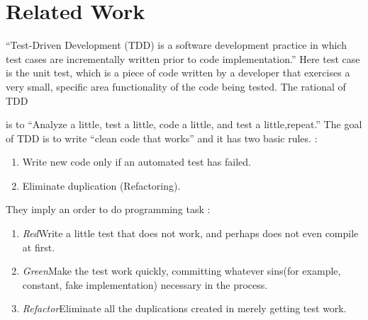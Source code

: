 
\chapter{Related Work}
``Test-Driven Development (TDD) is a software development practice in which
test cases are incrementally written prior to code
implementation.''\cite{George_2003} Here test case is the unit test, which
is a piece of code written by a developer that exercises a very small,
specific area functionality of the code being tested. The rational of TDD


is to ``Analyze a little, test a little, code a little, and test a
little,repeat.'' The goal of TDD is to write ``clean code that
works''\cite{Beck_TDD_2003} and it has two basic rules.
\cite{Beck_TDD_2003}:

\begin{enumerate}
\item Write new code only if an automated test has failed.
\item Eliminate duplication (Refactoring).
\end{enumerate}

\begin{description}
\item They imply an order to do programming task \cite{Beck_TDD_2003}:
\begin{enumerate}
\item \emph{Red}\newline Write a little test that does not work, and perhaps
does not even compile at first.
\item \emph{Green}\newline Make the test work quickly, committing whatever
sins(for example, constant, fake implementation) necessary in the process.
\item \emph{Refactor}\newline Eliminate all the duplications created in
merely getting test work.
\end{enumerate}
\end{description}

